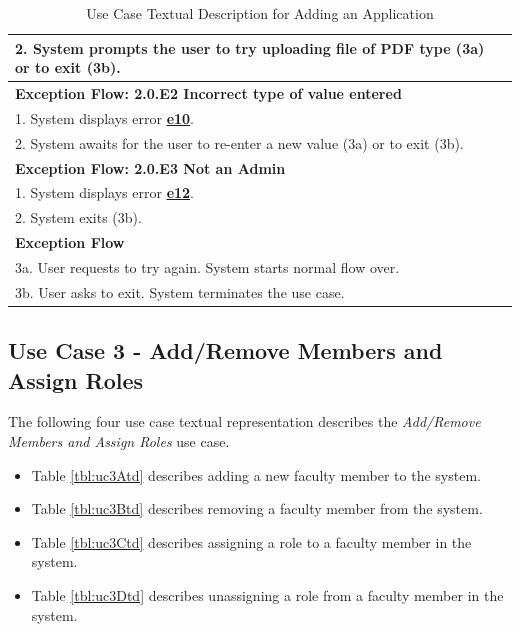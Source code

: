 \documentclass[fontsize=12pt,paper=letter,twoside]{scrartcl}
\begin{document}
\begin{table}[!htb]
\begin{center}
\begin{tabular}{|l|l|}
\\ 2. System prompts the user to try uploading file of PDF type (3a) or to exit (3b). \\ \hline 
\textbf{Exception Flow: 2.0.E2 Incorrect type of value entered}
\\ 1. System displays error  \hyperref[app:error]{\textbf{e10}}.
\\ 2. System awaits for the user to re-enter a new value (3a) or to exit (3b). \\ \hline 
\textbf{Exception Flow: 2.0.E3 Not an Admin}
\\ 1. System displays error  \hyperref[app:error]{\textbf{e12}}.
\\ 2. System exits (3b). \\ \hline 
\textbf{Exception Flow}
\\ 3a. User requests to try again. System starts normal flow over.
\\ 3b. User asks to exit. System terminates the use case.
\\ \hline
\end{tabular}
\end{center}
\caption {Use Case Textual Description for Adding an Application}
\label{tbl:uc2td}
\end{table}

\clearpage
\newpage
\subsection{Use Case 3 - Add/Remove Members and Assign Roles} \label{subsec:uc3}

The following four use case textual representation describes the \emph{Add/Remove Members and Assign Roles} use case.

\begin{itemize}
\item Table \ref{tbl:uc3Atd} describes adding a new faculty member to the system.
\item Table \ref{tbl:uc3Btd} describes removing a faculty member from the system.
\item Table \ref{tbl:uc3Ctd} describes assigning a role to a faculty member in the system.
\item Table \ref{tbl:uc3Dtd} describes unassigning a role from a faculty member in the system.
\end{itemize}
\end{document}
